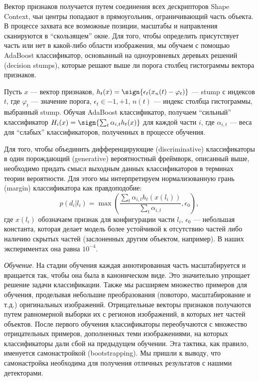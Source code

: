 Вектор признаков получается путем соединения всех дескрипторов Shape Context, чьи центры попадают в прямоугольник, ограничивающий часть объекта. В процессе захвата все возможные позиции, масштабы и направления сканируются в ``скользящем'' окне. Для того, чтобы определить присутствует часть или нет в какой-либо области изображения, мы обучаем с помощью AdaBoost классификатор, основынный на одноуровневых деревьях решений (decision stumps), которые решают выше ли порога столбец гистограммы вектора признаков.

Пусть $x$ --- вектор признаков, $h_t(x) = \sign{\epsilon_t(x_n(t) - \varphi_t)}$ --- stump с индексов $t$, где $\varphi_t$ --- значение порога, $\epsilon_t \in {-1, +1}$, $n(t)$ --- индекс столбца гистограммы, выбранный stump. Обучая AdaBoost классификатор, получаем ``сильный'' классификатор $H_i(x) = \sign{\sum_t{\alpha_{i,t}h_t(x)}}$ для каждой части $i$, где $\alpha_{i,t}$ --- веса для ``слабых'' классификаторов, полученных в процессе обучения.

Для того, чтобы объединить дифференцирующие (discriminative) классификаторы в один порождающий (generative) вероятностный фреймворк, описанный выше, необходимо придать смысл выходным данных классификаторов в терминах теории вероятности. Для этого мы интерпретируем нормализованную грань (margin) классификатора как правдоподобие:
\begin{displaymath}
  p(d_i|l_i) = \max{\left(\frac{\sum_t{\alpha_{i,t}h_t(x(l_i))}}{\sum_t{\alpha_{i,t}}},\epsilon_0\right)},
\end{displaymath}
где $x(l_i)$ обозначаем признак для конфигурации части $l_i$, $\epsilon_0$ --- небольшая константа, которая делает модель более устойчивой к отсутствию частей либо наличию скрытых частей (заслоненных другим объектом, например). В наших экспериментах она равна $10^{-4}$.

\emph{Обучение}. На стадии обучения каждая аннотированная часть масштабируется и вращается так, чтобы она была в каноническом виде. Это значительно упрощает решение задачи классификации. Также мы расширяем множество примеров для обучения, проделывая небольшие преобразования (повоторо, масштабирование и т.д.) оригинальных изображений. Отрицательные векторы признаков получаются путем равномерной выборки их с регионов изображений, в которых нет частей объектов. После первого обучения классификаторы переобучаются с множество отрицательных примеров, дополненных теми изображениями, на которых классификаторы дали сбой на предыдущем обучении. Эта тактика, как правило, именуется самонастройкой (bootstrapping). Мы пришли к выводу, что самонастройка необходима для получения отличных результатов с нашими детекторами.

